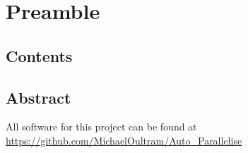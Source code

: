 \chapter{Preamble}
\section{Contents}
\makeatletter
\newcommand*{\toccontents}{}
\makeatother
\toccontents

\section{Abstract}

\begin{center}
All software for this project can be found at \\
\url{https://github.com/MichaelOultram/Auto\_Parallelise}
\end{center}

\begin{comment}
\section{Acknowledgements}
Rust Compiler (\url{https://github.com/rust-lang/rust})

Serde (\url{https://serde.rs/}): used to convert rust objects into JSON and back again
\end{comment}
